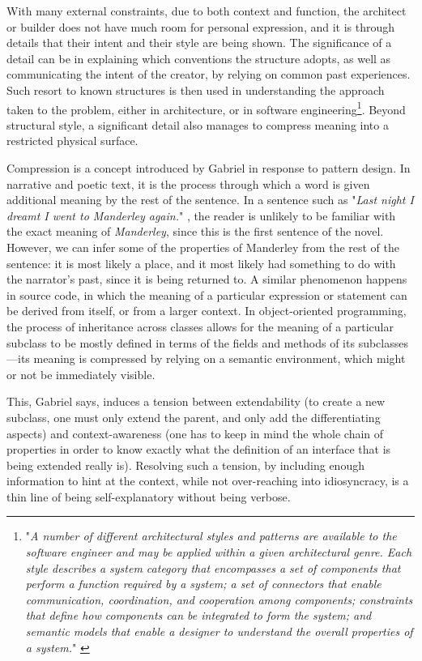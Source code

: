 With many external constraints, due to both context and function, the architect or builder does not have much room for personal expression, and it is through details that their intent and their style are being shown. The significance of a detail can be in explaining which conventions the structure adopts, as well as communicating the intent of the creator, by relying on common past experiences. Such resort to known structures is then used in understanding the approach taken to the problem, either in architecture, or in software engineering\footnote{"\emph{A number of different architectural styles and patterns are available to the software engineer and may be applied within a given architectural genre. Each style describes a system category that encompasses a set of components that perform a function required by a system; a set of connectors that enable communication, coordination, and cooperation among components; constraints that define how components can be integrated to form the system; and semantic models that enable a designer to understand the overall properties of a system.}" \citep{pressman_software_2014}}. Beyond structural style, a significant detail also manages to compress meaning into a restricted physical surface.

Compression is a concept introduced by Gabriel in response to pattern design. In narrative and poetic text, it is the process through which a word is given additional meaning by the rest of the sentence. In a sentence such as "\emph{Last night I dreamt I went to Manderley again.}" \citep{dumaurier_rebecca_1938}, the reader is unlikely to be familiar with the exact meaning of \emph{Manderley}, since this is the first sentence of the novel. However, we can infer some of the properties of Manderley from the rest of the sentence: it is most likely a place, and it most likely had something to do with the narrator's past, since it is being returned to. A similar phenomenon happens in source code, in which the meaning of a particular expression or statement can be derived from itself, or from a larger context. In object-oriented programming, the process of inheritance across classes allows for the meaning of a particular subclass to be mostly defined in terms of the fields and methods of its subclasses—its meaning is compressed by relying on a semantic environment, which might or not be immediately visible.

This, Gabriel says, induces a tension between extendability (to create a new subclass, one must only extend the parent, and only add the differentiating aspects) and context-awareness (one has to keep in mind the whole chain of properties in order to know exactly what the definition of an interface that is being extended really is). Resolving such a tension, by including enough information to hint at the context, while not over-reaching into idiosyncracy, is a thin line of being self-explanatory without being verbose.

